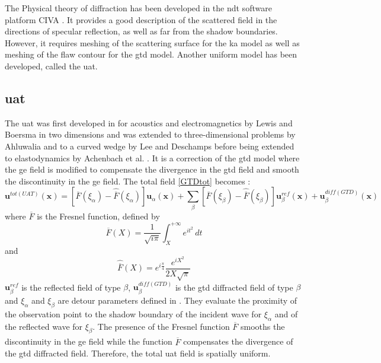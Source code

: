 The Physical theory of diffraction has been developed in the \acrshort{ndt} software platform CIVA \cite{systmodel}. It provides a good description of the scattered field in the directions of specular reflection, as well as far from the shadow boundaries. However, it requires meshing of the scattering surface for the \acrshort{ka} model as well as meshing of the flaw contour for the \acrshort{gtd} model. Another uniform model has been developed, called the \acrfull{uat}.

\subsection{\acrfull{uat}}
The \acrfull{uat} was first developed in for acoustics and electromagnetics by Lewis and Boersma \cite{Lewis} in two dimensions and was extended to three-dimensional problems by Ahluwalia \cite{Ahluwalia} and to a curved wedge by Lee and Deschamps \cite{LeeDeschamps} before being extended to elastodynamics by Achenbach et al. \cite{Achenbach}. It is a correction of the \acrshort{gtd} model where the \acrshort{ge} field is modified to compensate the divergence in the \acrshort{gtd} field and smooth the discontinuity in the \acrshort{ge} field. The total field \eqref{GTDtot} becomes :
\begin{equation}
\mathbf{u}^{tot(UAT)}(\mathbf{x})=\left[ \overline{F}(\xi_{\alpha})-\hat{\overline{F}}(\xi_{\alpha})\right]\mathbf{u}_{\alpha}(\mathbf{x})+\sum_{\beta} \left[ \overline{F}(\xi_{\beta})-\hat{\overline{F}}(\xi_{\beta})\right]\mathbf{u}^{ref}_{\beta}(\mathbf{x})+\mathbf{u}_{\beta}^{diff(GTD)}(\mathbf{x})
\label{eqUAT}
\end{equation}
where $\overline{F}$ is the Fresnel function, defined by 
\begin{equation}
\overline{F}(X)=\frac{1}{\sqrt{i\pi}}\int_X^{+\infty} e^{it^2}\,dt
\label{defFresnel}
\end{equation}
and 
\begin{equation}
\hat{\overline{F}}(X)=e^{i\frac{\pi}{4}}\dfrac{e^{iX^2}}{2X\sqrt{\pi}}
\end{equation}
$\mathbf{u}^{ref}_{\beta}$ is the reflected field of type $\beta$, $\mathbf{u}_{\beta}^{diff(GTD)}$ is the \acrshort{gtd} diffracted field of type $\beta$ and $\xi_{\alpha}$ and $\xi_{\beta}$ are detour parameters defined in \cite{LeeDeschamps}. They evaluate the proximity of the observation point to the shadow boundary of the incident wave for $\xi_{\alpha}$ and of the reflected wave for $\xi_{\beta}$. The presence of the Fresnel function $\overline{F}$ smooths the discontinuity in the \acrshort{ge} field while the function $\hat{\overline{F}}$ compensates the divergence of the \acrshort{gtd} diffracted field. Therefore, the total \acrshort{uat} field is spatially uniform.

